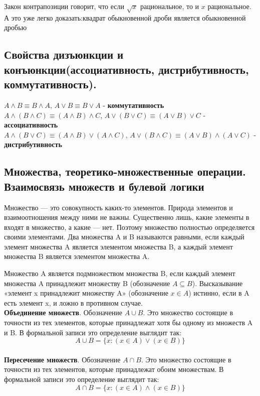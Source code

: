 \documentclass[a4paper, 10pt]{article}
\begin{document}
Закон контрапозиции говорит, что если $\sqrt{x}$ рациональное, то и $x$ рациональное. А это уже легко доказать:квадрат обыкновенной дроби является обыкновенной дробью


\subsection{Свойства дизъюнкции и конъюнкции(ассоциативность, дистрибутивность, коммутативность).}


$A \wedge B \equiv B \wedge A$, \qquad $A \vee B \equiv B \vee A$ - \textbf{коммутативность} \\

\noindent $A \wedge (B \wedge C) \equiv (A \wedge B) \wedge C$, \qquad $A \vee (B \vee C) \equiv (A \vee B) \vee C$ - \textbf{ассоциативность} \\

\noindent $A \wedge (B \vee C) \equiv (A \wedge B) \vee (A \wedge C)$, \qquad $A \vee (B \wedge C) \equiv (A \vee B) \wedge (A \vee C)$ - \textbf{дистрибутивность}


\subsection{Множества, теоретико-множественные операции. Взаимосвязь множеств и булевой логики}

Множество — это совокупность каких-то элементов. Природа элементов и взаимоотношения между ними не важны. Существенно лишь, какие элементы в входят в множество, а какие — нет. Поэтому множество полностью определяется своими элементами. Два множества A и B называются равными, если каждый элемент множества A является элементом множества B, а каждый элемент множества B является элементом множества A.

Множество A является подмножеством множества B, если каждый элемент множества A принадлежит множеству B (обозначение $A \subseteq B$). Высказывание «элемент x принадлежит множеству A» (обозначение $x \in A$) истинно, если в A есть элемент x, и ложно в противном случае.
\\

\textbf{Объединение множеств}. Обозначение $A \cup B$. Это множество состоящие в точности из тех элементов, которые принадлежат хотя бы одному из множеств A и B. В формальной записи это определение выглядит так:
$$A \cup B = \{x \colon (x \in A) \vee (x \in B)\}$$ \\

\textbf{Пересечение множеств}. Обозначение $A \cap B$. Это множество состоящие в точности из тех элементов, которые принадлежат обоим множествам. В формальной записи это определение выглядит так:
$$A \cap B = \{x \colon (x \in A) \wedge (x \in B)\}$$ \\
\end{document}
